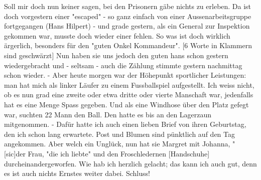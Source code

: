 \def\day{14. mai 1943}
\mktitle

Soll mir doch nun keiner sagen, bei den Prisonern g\"{a}be nichts zu erleben.
Da ist doch vorgestern einer "escaped" - so ganz einfach von einer Aussenarbeitsgruppe fortgegangen (Hans Hilpert) - und grade gestern, als ein General zur Inspektion gekommen war, musste doch wieder einer fehlen.
So was ist doch wirklich \"{a}rgerlich, besonders f\"{u}r den "guten Onkel Kommandeur".
{\color{red} [6 Worte in Klammern sind geschw\"{a}rzt] }
Nun haben sie uns jedoch den guten hans schon gestern wiedergebracht und - seltsam - auch die Z\"{a}hlung stimmte gestern nachmittag schon wieder.
- Aber heute morgen war der H\"{o}hepunkt sportlicher Leistungen: man hat mich als linker L\"{a}ufer zu einem Fussballspiel aufgestellt.
Ich weiss nicht, ob es nun grad eine zweite oder etwa dritte oder vierte Manschaft war, jedenfalls hat es eine Menge Spass gegeben.
Und als eine Windhose \"{u}ber den Platz gefegt war, suchten 22 Mann den Ball.
Den hatte es bis an den Lagerzaun mitgenommen.
- Daf\"{u}r hatte ich auch einen lieben Brief von ihren Geburtstag, den ich schon lang erwartete.
Post und Blumen sind p\"{u}nktlich auf den Tag angekommen.
Aber welch ein Ungl\"{u}ck, nun hat sie Margret mit Johanna, "{\color{red} [sic]der Frau, "die ich liebte" und den Froschledernen [Handschuhe] } durcheinandergeworfen.
Wie hab ich herzlich gelacht; das kann ich auch gut, denn es ist auch nichts Ernstes weiter dabei.
Schluss!
\clearpage

